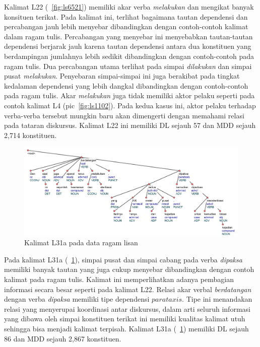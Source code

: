 Kalimat L22 (\pic~\ref{fig:ls6521}) memiliki akar verba \textit{melakukan} dan mengikat banyak konsituen terikat. Pada kalimat ini, terlihat bagaimana tautan dependensi dan percabangan jauh lebih menyebar dibandingkan dengan contoh-contoh kalimat dalam ragam tulis. Percabangan yang menyebar ini menyebabkan tautan-tautan dependensi berjarak jauh karena tautan dependensi antara dua konstituen yang berdampingan jumlahnya lebih sedikit dibandingkan dengan contoh-contoh pada ragam tulis. Dua percabangan utama terlihat pada simpai \textit{dilakukan} dan simpai pusat \textit{melakukan}. Penyebaran simpai-simpai ini juga berakibat pada tingkat kedalaman dependensi yang lebih dangkal dibandingkan dengan contoh-contoh pada ragam tulis. Akar \textit{melakukan} juga tidak memiliki aktor pelaku seperti pada contoh kalimat L4 (pic~\ref{fig:ls1102}). Pada kedua kasus ini, aktor pelaku terhadap verba-verba tersebut mungkin baru akan dimengerti dengan memahami relasi pada tataran diskursus. Kalimat L22 ini memiliki DL sejauh 57 dan MDD sejauh 2,714 konstituen. 

\begin{figure}
	\centering \includegraphics[width=1
	\textwidth] {pics/ls1716.jpg} 
	\caption{Kalimat L31a pada data ragam lisan} 
	\label{fig:ls1716} 
\end{figure}

Pada kalimat L31a (\pic~\ref{fig:ls1716}), simpai pusat dan simpai cabang pada verba \textit{dipaksa} memiliki banyak tautan yang juga cukup menyebar dibandingkan dengan contoh kalimat pada ragam tulis. Kalimat ini memperlihatkan adanya pembagian informasi secara besar seperti pada kalimat L22. Relasi akar verbal \textit{berdatangan} dengan verba \textit{dipaksa} memiliki tipe dependensi $parataxis$. Tipe ini menandakan relasi yang menyerupai koordinasi antar diskursus, dalam arti seluruh informasi yang dibawa oleh simpai konstituen terikat ini memiliki kualitas kalimat utuh sehingga bisa menjadi kalimat terpisah. Kalimat L31a (\pic~\ref{fig:ls1716}) memiliki DL sejauh 86 dan MDD sejauh 2,867 konstituen. 


